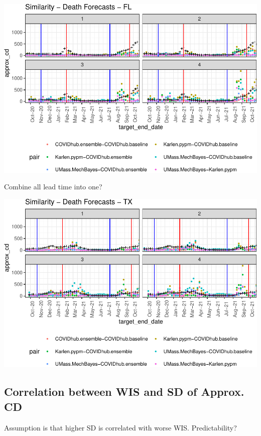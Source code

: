 \documentclass[
]{article}
\begin{document}
\begin{center}\includegraphics{cd_approx_2_files/figure-latex/unnamed-chunk-8-1} \end{center}

Combine all lead time into one?

\begin{center}\includegraphics{cd_approx_2_files/figure-latex/unnamed-chunk-9-1} \end{center}

\hypertarget{correlation-between-wis-and-sd-of-approx.-cd}{%
\subsection{Correlation between WIS and SD of Approx.
CD}\label{correlation-between-wis-and-sd-of-approx.-cd}}

Assumption is that higher SD is correlated with worse WIS.
Predictability?
\end{document}
